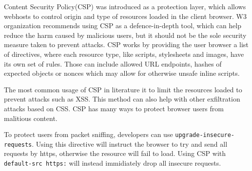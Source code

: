\documentclass[11]{article}   %
\begin{document}
%
%

Content Security Policy(CSP) was introduced as a protection layer, which allows webhosts to control origin and type of resources loaded in the client browser. 
W3 organization recommends using CSP as a defence-in-depth tool, which can help reduce the harm caused by malicious users, but it should not be the sole security measure taken to prevent attacks.
CSP works by providing the user browser a list of directives, where each resource type, like scripts, stylesheets and images, have its own set of rules.
Those can include allowed URL endpoints, hashes of expected objects or nonces which may allow for otherwise unsafe inline scripts.

The most common usage of CSP in literature it to limit the resources loaded to prevent attacks such as XSS.
This method can also help with other exfiltration attacks based on CSS.
CSP has many ways to protect browser users from malitious content.

To protect users from packet sniffing, developers can use \texttt{upgrade-insecure-requests}.
Using this directive will instruct the browser to try and send all requests by https, otherwise the resource will fail to load.
Using CSP with \texttt{default-src https:} will instead immidiately drop all insecure requests.
\end{document}
